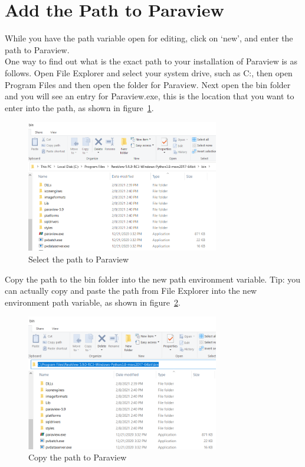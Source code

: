 \section{Add the Path to Paraview}

While you have the path variable open for editing, click on `new', and enter the path to Paraview.\\

One way to find out what is the exact path to your installation of Paraview is as follows.  Open File Explorer and select your system drive, such as C:, then open Program Files and then open the folder for Paraview.  Next open the bin folder and you will see an entry for Paraview.exe, this is the location that you want to enter into the path, as shown in figure~\ref{fg:path-3}.

\begin{figure}[H]
\begin{center}
\includegraphics[width=0.75\textwidth]{path-3}
\caption{Select the path to Paraview}\label{fg:path-3}
\end{center}
\end{figure}

Copy the path to the bin folder into the new path environment variable.  Tip: you can actually copy and paste the path from File Explorer into the new environment path variable, as shown in figure~\ref{fg:path-4}.\\

\begin{figure}[H]
\begin{center}
\includegraphics[width=0.75\textwidth]{path-4}
\caption{Copy the path to Paraview}\label{fg:path-4}
\end{center}
\end{figure}

